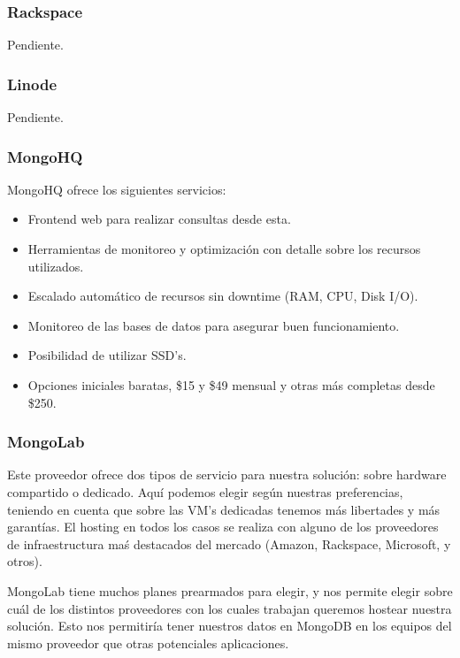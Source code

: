 \documentclass[a4paper,10pt,twoside]{article}
\begin{document}
\subsubsection{Rackspace}

Pendiente.


\subsubsection{Linode}

Pendiente.


\subsubsection{MongoHQ}

MongoHQ ofrece los siguientes servicios:

\begin{itemize}
	\item Frontend web para realizar consultas desde esta.
	\item Herramientas de monitoreo y optimización con detalle sobre los recursos utilizados.
	\item Escalado automático de recursos sin downtime (RAM, CPU, Disk I/O).
	\item Monitoreo de las bases de datos para asegurar buen funcionamiento.
	\item Posibilidad de utilizar SSD's.
	\item Opciones iniciales baratas, \$15 y \$49 mensual y otras más completas desde \$250.
\end{itemize}


\subsubsection{MongoLab}

Este proveedor ofrece dos tipos de servicio para nuestra solución: sobre hardware compartido o dedicado. Aquí podemos elegir según nuestras preferencias, teniendo en cuenta que sobre las VM's dedicadas tenemos más libertades y más garantías. El hosting en todos los casos se realiza con alguno de los proveedores de infraestructura maś destacados del mercado (Amazon, Rackspace, Microsoft, y otros).

MongoLab tiene muchos planes prearmados para elegir, y nos permite elegir sobre cuál de los distintos proveedores con los cuales trabajan queremos hostear nuestra solución. Esto nos permitiría tener nuestros datos en MongoDB en los equipos del mismo proveedor que otras potenciales aplicaciones.
\end{document}
